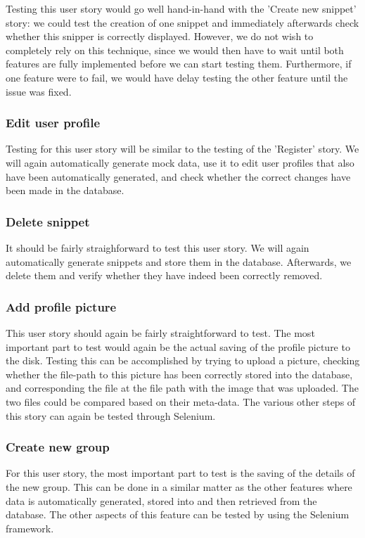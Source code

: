 \documentclass[10pt,a4paper,BCOR12mm, headexclude, footexclude,
  twoside, openright]{scrartcl}
\numberwithin{equation}{section} %
\numberwithin{figure}{section} %
\numberwithin{table}{section} %
\begin{document}
Testing this user story would go well hand-in-hand with the 'Create new snippet'
story: we could test the creation of one snippet and immediately afterwards
check whether this snipper is correctly displayed.  However, we do not wish to
completely rely on this technique, since we would then have to wait until both
features are fully implemented before we can start testing them. Furthermore, if
one feature were to fail, we would have delay testing the other feature until
the issue was fixed.

\subsubsection*{Edit user profile}
Testing for this user story will be similar to the testing of the 'Register'
story. We will again automatically generate mock data, use it to edit user
profiles that also have been automatically generated, and check whether the
correct changes have been made in the database.

\subsubsection*{Delete snippet}
It should be fairly straighforward to test this user story. We will again
automatically generate snippets and store them in the database. Afterwards, we
delete them and verify whether they have indeed been correctly removed.

\subsubsection*{Add profile picture}
This user story should again be fairly straightforward to test. The most important part to test would again be the actual saving of the profile picture to the disk.
Testing this can be accomplished by trying to upload a picture, checking whether the file-path to this picture has been correctly stored into the database, and corresponding the file at the file path with the image that was uploaded.
The two files could be compared based on their meta-data.
The various other steps of this story can again be tested through Selenium.

\subsubsection*{Create new group}
For this user story, the most important part to test is the saving of the details
of the new group. This can be done in a similar matter as the other features
where data is automatically generated, stored into and then retrieved from the
database.  The other aspects of this feature can be tested by using the Selenium
framework.
\end{document}
